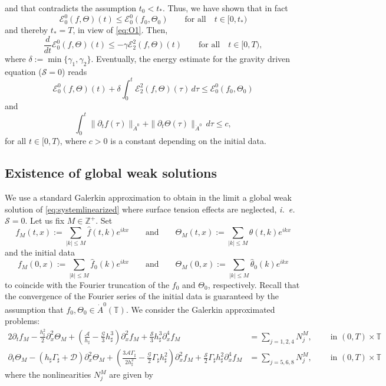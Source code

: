 \documentclass[reqno,11pt]{amsart}
\newcommand{\ZZ}{{\mathbb Z}}
\newcommand{\TT}{{\mathbb T}}
\newcommand{\pax}{\partial_x}
\newcommand{\bh}{h_\sharp}
\newcommand{\bG}{\Gamma_\sharp}
\begin{document}
{and that contradicts the assumption $t_0<t_*$. Thus, we have shown that in fact
\begin{equation}\label{eq:Edecay}
\mathscr{E}_0^0(f,\Theta)(t)\leq \mathscr{E}_0^0(f_0,\Theta_0)\qquad \mbox{for all}\quad t\in[0,t_*)
\end{equation}
and thereby $t_*=T$,
in view of \eqref{eq:O1}.
Then,
\begin{equation}\label{eq:E}
\frac{d}{dt}\mathscr{E}_0^0(f,\Theta)(t)\leq -\gamma \mathscr{E}^2_2(f,\Theta)(t)\qquad \mbox{for all}\quad t\in[0,T),
\end{equation}
where $\delta:=\min\{\gamma_1,\gamma_2\}$. Eventually, the energy estimate for the gravity driven equation ($\mathcal S =0$) reads
\[
	\mathscr{E}^0_0(f,\Theta)(t)+\delta\int_0^t \mathscr{E}^2_2(f,\Theta)(\tau)\, d\tau \leq \mathscr{E}^0_0(f_0,\Theta_0)
\]
and
\[
	\int_0^t \|\partial_t f(\tau)\|_{\dot A^0}+\|\partial_t \Theta(\tau)\|_{\dot A^0}\, d\tau\leq c,
\]
for all $t\in[0,T)$, where $c>0$ is a constant depending on the initial data.

\medskip


\subsection{Existence of global weak solutions}\label{ss:gl} 
We use a standard Galerkin approximation to obtain in the limit a global weak solution of \eqref{eq:systemlinearized} where surface tension effects are neglected, \emph{i.~e.} $\mathcal{S}=0$. Let us fix $M\in \ZZ^+$. Set
\[
	f_M(t,x):=\sum_{|k|\leq M} \hat f(t,k)e^{ikx}\qquad \mbox{and}\qquad 	\Theta_M(t,x):=\sum_{|k|\leq M} \hat \theta(t,k)e^{ikx}
\]
and the initial data
\[
	f_M(0,x):=\sum_{|k|\leq M} \hat f_0(k)e^{ikx}\qquad \mbox{and}\qquad 	\Theta_M(0,x):=\sum_{|k|\leq M} \hat \theta_0(k)e^{ikx}
\]
to coincide with the Fourier truncation of the $f_0$ and $\Theta_0$, respectively. Recall that the convergence of the Fourier series of the initial data is guaranteed by the assumption that $f_0,\Theta_0\in \dot A^0(\TT)$. We consider the Galerkin approximated problems:
	\begin{alignat*}{2}
	\partial_t f_M-\frac{\bh^2}{2}\partial_x^2 \Theta_M +\left(\frac{\mathcal{A}}{\bh}-\frac{\mathcal{G}}{3}\bh^3\right)\partial_x^2 f_M+\frac{\mathcal{S}}{3}\bh^3\partial_x^4 f_M&=\sum_{j=1,2,4} N_j^M,\; && \text{ in }(0,T)\times\TT\\
	\partial_t \Theta_M -\left(\bh\bG+\mathcal{D}\right)\pax^2\Theta_M+\left(\frac{3\mathcal{A}\bG}{2\bh^2}-\frac{\mathcal{G}}{2}\bG\bh^2\right) \pax^2f_M+\frac{\mathcal{S}}{2}\bG\bh^2 \pax^4f_M &= \sum_{j=5,6,8} N_j^M,\;&& \text{ in }(0,T)\times\TT
	\end{alignat*}
where the nonlinearities $N_j^M$ are given by

}
\end{document}
